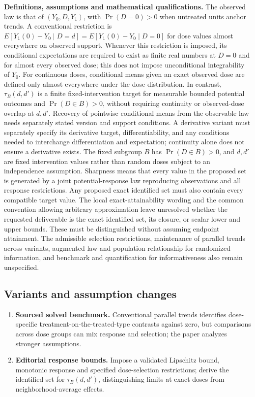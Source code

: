 \documentclass[11pt,a4paper]{article}
\begin{document}
\textbf{Definitions, assumptions and mathematical qualifications.} The observed law is that of \((Y_0,D,Y_1)\), with \(\Pr(D=0)>0\) when untreated units anchor trends. A conventional restriction is \(E[Y_1(0)-Y_0\mid D=d]=E[Y_1(0)-Y_0\mid D=0]\) for dose values almost everywhere on observed support. Whenever this restriction is imposed, its conditional expectations are required to exist as finite real numbers at \(D=0\) and for almost every observed dose; this does not impose unconditional integrability of \(Y_0\). For continuous doses, conditional means given an exact observed dose are defined only almost everywhere under the dose distribution. In contrast, \(\tau_B(d,d')\) is a finite fixed-intervention target for measurable bounded potential outcomes and \(\Pr(D\in B)>0\), without requiring continuity or observed-dose overlap at \(d,d'\). Recovery of pointwise conditional means from the observable law needs separately stated version and support conditions. A derivative variant must separately specify its derivative target, differentiability, and any conditions needed to interchange differentiation and expectation; continuity alone does not ensure a derivative exists. The fixed subgroup \(B\) has \(\Pr(D\in B)>0\), and \(d,d'\) are fixed intervention values rather than random doses subject to an independence assumption. Sharpness means that every value in the proposed set is generated by a joint potential-response law reproducing observations and all response restrictions. Any proposed exact identified set must also contain every compatible target value. The local exact-attainability wording and the common convention allowing arbitrary approximation leave unresolved whether the requested deliverable is the exact identified set, its closure, or scalar lower and upper bounds. These must be distinguished without assuming endpoint attainment. The admissible selection restrictions, maintenance of parallel trends across variants, augmented law and population relationship for randomized information, and benchmark and quantification for informativeness also remain unspecified.
\subsection*{Variants and assumption changes}
\begin{enumerate}
\item \textbf{Sourced solved benchmark.} Conventional parallel trends identifies dose-specific treatment-on-the-treated-type contrasts against zero, but comparisons across dose groups can mix response and selection; the paper analyzes stronger assumptions.
\item \textbf{Editorial response bounds.} Impose a validated Lipschitz bound, monotonic response and specified dose-selection restrictions; derive the identified set for \(\tau_B(d,d')\), distinguishing limits at exact doses from neighborhood-average effects.
\end{enumerate}
\end{document}
